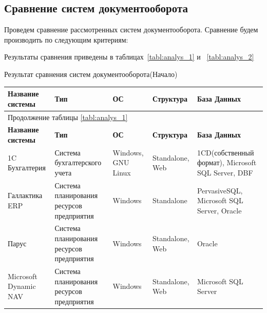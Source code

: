 \documentclass[14pt,a4paper]{reportmod}
\begin{document}
\subsection{Сравнение систем документооборота}
Проведем сравнение рассмотренных систем документооборота. Сравнение будем производить по следующим критериям:
\setlength\itemindent{1in}
\begin{gostitemize}
\end{gostitemize}
Результаты сравнения приведены в таблицах~\ref{tabl:analys_1} и ~\ref{tabl:analys_2}

\begin{table}[ht]
  \centering
  \caption{Результат сравнения систем документооборота(Начало)}
  \label{tabl:analys_1}
\end{table}

\begin{small}
  \begin{longtable}{|p{3.2cm}|p{3cm}|p{2cm}|p{2.5cm}|p{4cm}|}
    \hline
    \multicolumn{1}{|p{3.2cm}|}{\bfseries{Название системы}} &
    \multicolumn{1}{p{3cm}|}{\bfseries{Тип}} &
    \multicolumn{1}{p{2cm}|}{\bfseries{ОС}} &
    \multicolumn{1}{p{2.5cm}|}{\bfseries{Структура}} &
    \multicolumn{1}{p{4cm}|}{\bfseries{База Данных}}\\
    \hline
    \endfirsthead
    \multicolumn{5}{l}{{Продолжение таблицы \ref{tabl:analys_1}}} \\ \hline
    \multicolumn{1}{|p{3.2cm}|}{\bfseries{Название системы}} &
    \multicolumn{1}{p{3cm}|}{\bfseries{Тип}} &
    \multicolumn{1}{p{2cm}|}{\bfseries{ОС}} &
    \multicolumn{1}{p{2.5cm}|}{\bfseries{Структура}} &
    \multicolumn{1}{p{4cm}|}{\bfseries{База Данных}}\\
    \hline
    \endhead
    \hline
    1C Бухгалтерия & Система бухгалтерского учета & Windows, GNU Linux & Standalone, Web & 1CD(собственный формат), Microsoft SQL Server, DBF\\
    \hline
    Галлактика ERP & Система планирования ресурсов предприятия & Windows  & Standalone  & PervasiveSQL, Microsoft SQL Server, Oracle\\
    \hline
    Парус & Система планирования ресурсов предприятия & Windows & Standalone, Web & Oracle\\
    \hline
    Microsoft Dynamic NAV & Система планирования ресурсов предприятия & Windows & Standalone, Web & Microsoft SQL Server\\
    \hline
\end{longtable}
\end{small}
\end{document}
